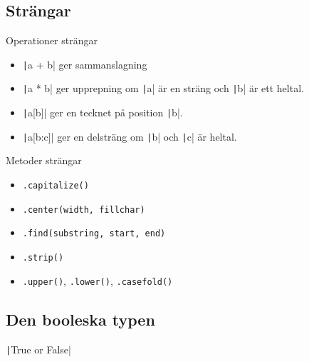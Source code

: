 \subsection{Strängar}

\begin{frame}[fragile]
  \begin{block}{Operationer strängar}
    \begin{itemize}
      \item \texttt|a + b| ger sammanslagning
      \item \texttt|a * b| ger upprepning om \texttt|a| 
        är en sträng och \texttt|b| är ett heltal.
      \item \texttt|a[b]| ger en tecknet på position 
        \texttt|b|.
      \item \texttt|a[b:c]| ger en delsträng om 
        \texttt|b| och  \texttt|c| är heltal.
    \end{itemize}
  \end{block}

  \pause

  \begin{block}{Metoder strängar}
    \begin{itemize}
      \item \texttt{.capitalize()}
      \item \texttt{.center(width, fillchar)}
      \item \texttt{.find(substring, start, end)}
      \item \texttt{.strip()}
      \item \texttt{.upper()}, \texttt{.lower()}, \texttt{.casefold()}
    \end{itemize}
  \end{block}
\end{frame}

\subsection{Den booleska typen}

\begin{frame}
  \begin{center}
    \texttt|True or False|
  \end{center}
\end{frame}

